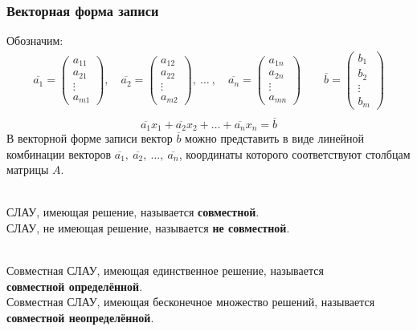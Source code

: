 \subsubsection{Векторная форма записи}
Обозначим:
\begin{gather*}
\overline{a_1} = \begin{pmatrix}
a_{11}\\
a_{21} \\
\vdots \\
a_{m1}
\end{pmatrix},\quad \overline{a_2} = \begin{pmatrix}
a_{12}\\
a_{22} \\
\vdots \\
a_{m2}
\end{pmatrix},\ \ldots\ ,\quad \overline{a_n} = \begin{pmatrix}
a_{1n}\\
a_{2n} \\
\vdots \\
a_{mn}
\end{pmatrix} \qquad \overline{b} = \begin{pmatrix}
b_1\\
b_2\\
\vdots \\
b_m
\end{pmatrix} \\
\end{gather*} \vspace{-3\topsep}
\[ \overline{a_1}x_1 + \overline{a_2}x_2 + \ldots + \overline{a_n}x_n = \overline{b} \]
В векторной форме записи вектор $\overline{b}$ можно представить в виде линейной комбинации векторов $\overline{a_1},\ \overline{a_2},\ \ldots,\ \overline{a_n}$, координаты которого соответствуют столбцам матрицы $A$.
\newpage
\begin{definition}\ \\
СЛАУ, имеющая решение, называется \textbf{совместной}.\\
СЛАУ, не имеющая решение, называется \textbf{не совместной}.
\end{definition}
\begin{definition}\ \\
Совместная СЛАУ, имеющая единственное решение, называется \\ \textbf{совместной определённой}. \\
Совместная СЛАУ, имеющая бесконечное множество решений, называется \\ \textbf{совместной неопределённой}.
\end{definition}
